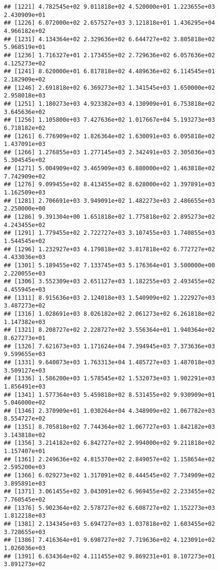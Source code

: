 \documentclass[]{article}
\begin{document}
\begin{verbatim}
## [1221] 4.782545e+02 9.011818e+02 4.520000e+01 1.223655e+03 2.430909e+01
## [1226] 6.072000e+02 2.657527e+03 3.121818e+01 1.436295e+04 4.966182e+02
## [1231] 4.134364e+02 2.329636e+02 6.644727e+02 3.805818e+02 5.968519e+01
## [1236] 1.716327e+01 2.173455e+02 2.729636e+02 6.057636e+02 4.125273e+02
## [1241] 8.620000e+01 6.817818e+02 4.489636e+02 6.114545e+01 2.182909e+02
## [1246] 2.691818e+02 6.369273e+02 1.341545e+03 1.650000e+02 2.958018e+03
## [1251] 1.180273e+03 4.923382e+03 4.130909e+01 6.753818e+02 3.645636e+02
## [1256] 1.105800e+03 7.427636e+02 1.017667e+04 5.193273e+03 6.718182e+02
## [1261] 6.776909e+02 1.826364e+02 1.630091e+03 6.095818e+02 1.437091e+03
## [1266] 1.276855e+03 1.277145e+03 2.342491e+03 2.305036e+03 5.304545e+02
## [1271] 5.004909e+02 3.465909e+03 6.880000e+02 1.463818e+02 7.742909e+02
## [1276] 9.099455e+02 8.413455e+02 8.628000e+02 1.397891e+03 1.162509e+03
## [1281] 2.706691e+03 3.949091e+02 1.482273e+03 2.486655e+03 2.250000e+00
## [1286] 9.391304e+00 1.651818e+02 1.775818e+02 2.895273e+02 4.243455e+02
## [1291] 1.779455e+02 2.722727e+03 3.107455e+03 1.740855e+03 1.544545e+02
## [1296] 1.232927e+03 4.179818e+02 3.817818e+02 6.772727e+02 4.433036e+03
## [1301] 5.189455e+02 7.133745e+03 5.176364e+01 3.500000e+00 2.220055e+03
## [1306] 3.552309e+03 2.651127e+03 1.182255e+03 2.493455e+02 4.455945e+03
## [1311] 8.915636e+03 2.124018e+03 1.540909e+02 1.222927e+03 3.487273e+02
## [1316] 1.028691e+03 8.026182e+02 2.061273e+02 6.261818e+02 1.147382e+03
## [1321] 8.208727e+02 2.228727e+02 3.556364e+01 1.940364e+02 8.627273e+01
## [1326] 7.621673e+03 1.171624e+04 7.394945e+03 7.373636e+03 9.599655e+03
## [1331] 9.640073e+03 1.763313e+04 1.485727e+03 1.487018e+03 3.509127e+03
## [1336] 1.586200e+03 1.578545e+02 1.532073e+03 1.902291e+03 1.856491e+03
## [1341] 1.577364e+03 5.459818e+02 8.531455e+02 9.930909e+01 5.046000e+02
## [1346] 2.370909e+01 1.030264e+04 4.348909e+02 1.067782e+03 8.554727e+02
## [1351] 8.705818e+02 7.744364e+02 1.067727e+03 1.842182e+03 3.143818e+02
## [1356] 3.214182e+02 6.842727e+02 2.994000e+02 9.211818e+02 1.157407e+01
## [1361] 2.249636e+02 4.815370e+02 2.849057e+02 1.158654e+02 2.595200e+03
## [1366] 6.029273e+02 1.317091e+02 8.444545e+02 7.734909e+02 3.895891e+03
## [1371] 3.061455e+02 3.043091e+02 6.969455e+02 2.233455e+02 7.760545e+02
## [1376] 5.902364e+02 2.578727e+02 6.608727e+02 1.152273e+03 1.812218e+03
## [1381] 2.134345e+03 5.694727e+03 1.037818e+02 1.603455e+02 3.728655e+03
## [1386] 7.416364e+01 9.698727e+02 7.719636e+02 4.123091e+02 1.026036e+03
## [1391] 6.634364e+02 4.111455e+02 9.869231e+01 8.107273e+01 3.891273e+02

\end{verbatim}
\end{document}
